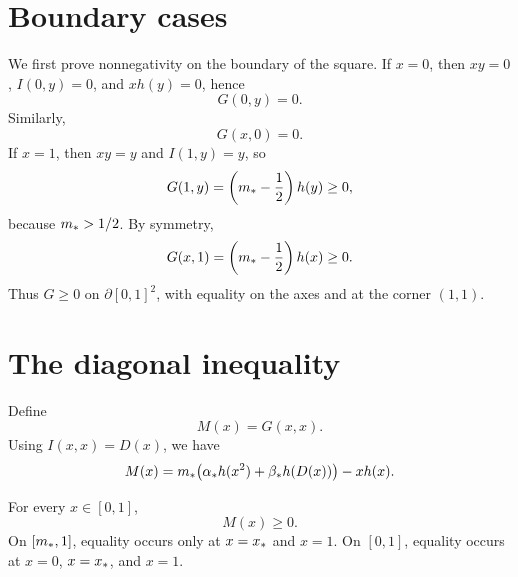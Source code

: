 \section{Boundary cases}\label{sec:boundary}

We first prove nonnegativity on the boundary of the square.  If \(x=0\), then \(xy=0\), \(I(0,y)=0\), and \(xh(y)=0\), hence
\begin{equation}\label{eq:axis1}
  G(0,y)=0.
\end{equation}
Similarly,
\begin{equation}\label{eq:axis2}
  G(x,0)=0.
\end{equation}
If \(x=1\), then \(xy=y\) and \(I(1,y)=y\), so
\begin{equation}\label{eq:xone}
  G(1,y)=\left(m_*-\frac12\right)h(y)\ge 0,
\end{equation}
because \(m_*>1/2\).  By symmetry,
\begin{equation}\label{eq:yone}
  G(x,1)=\left(m_*-\frac12\right)h(x)\ge 0.
\end{equation}
Thus \(G\ge0\) on \(\partial[0,1]^2\), with equality on the axes and at the corner \((1,1)\).

\section{The diagonal inequality}\label{sec:diagonal}

Define
\begin{equation}\label{eq:Mdef}
  M(x)=G(x,x).
\end{equation}
Using \(I(x,x)=D(x)\), we have
\begin{equation}\label{eq:Mformula}
  M(x)=m_*\bigl(\alpha_* h(x^2)+\beta_* h(D(x))\bigr)-xh(x).
\end{equation}

\begin{lemma}\label{lem:diagonal}
For every \(x\in[0,1]\),
\begin{equation}\label{eq:Mnonneg}
  M(x)\ge0.
\end{equation}
On \([m_*,1]\), equality occurs only at \(x=x_*\) and \(x=1\).  On \([0,1]\), equality occurs at \(x=0\), \(x=x_*\), and \(x=1\).
\end{lemma}

